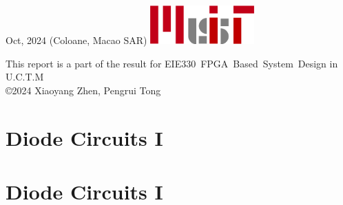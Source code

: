 \documentclass[a4paper,11pt]{article}
\begin{document}
\begin{titlepage}
    \vspace*{\fill}
		Oct, 2024\newline 
        (Coloane, Macao SAR)
        \vspace{0.7\baselineskip}\newline
        \includegraphics[width = 40mm]{../../Report_Resources/MUIT_origin.png}\par
        {\small This report is a part of the result for}
        {\small EIE330~FPGA~Based~System~Design in U.C.T.M}\\[0.25pt]
        {\small \copyright 2024 Xiaoyang Zhen, Pengrui Tong}

\end{titlepage}
\blankpage

\tableofcontents
\newpage

\section{Diode Circuits I}
%
\lipsum[2-4]\par
\lipsum[2-4]

\section{Diode Circuits I}
\end{document}
